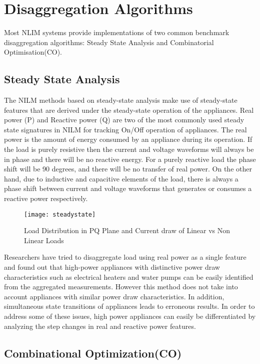 \section{Disaggregation Algorithms}
Most NLIM systems provide implementations of two common benchmark
disaggregation algorithms: Steady State Analysis and Combinatorial Optimisation(CO).

\subsection{Steady State Analysis}
The NILM methods based on steady-state analysis make use of steady-state features that are derived
under the steady-state operation of the appliances. Real power (P) and Reactive power (Q) are two of the
most commonly used steady state signatures in NILM  for tracking On/Off operation of appliances.
The real power is the amount of energy consumed by an appliance during its operation. If the load is
purely resistive then the current and voltage waveforms will always be in phase and there will be no
reactive energy. For a purely reactive load the phase shift will be 90 degrees, and there will be no transfer of real
power. On the other hand, due to inductive and capacitive elements of the load, there is always a phase
shift between current and voltage waveforms that generates or consumes a reactive power respectively.

\begin{figure}[H]
	\texttt{[image: steadystate]} %
	\caption{Load Distribution in PQ Plane and Current draw of Linear vs Non Linear Loads}
	\label{blck}
\end{figure}

Researchers have tried to disaggregate load using real power as a single feature and found
out that high-power appliances with distinctive power draw characteristics such as electrical heaters and
water pumps can be easily identified from the aggregated measurements. However this method does
not take into account appliances with similar power draw characteristics. In addition, simultaneous state
transitions of appliances leads to erroneous results. In order to address some of these issues, high power appliances can easily be differentiated
by analyzing the step changes in real and reactive power features.

\subsection{Combinational Optimization(CO)}

